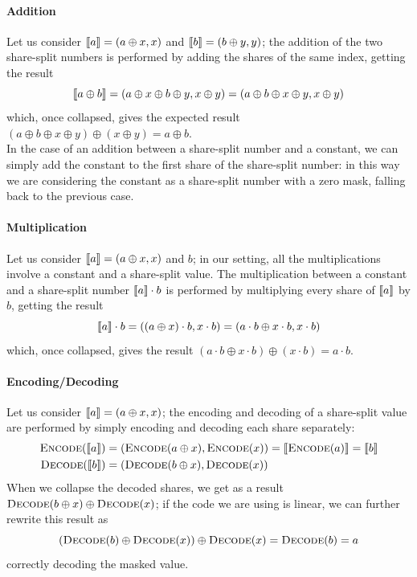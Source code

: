     \paragraph{Addition} Let us consider $ \llbracket a \rrbracket  = (a\oplus x, x)$ and $ \llbracket b \rrbracket  = (b\oplus y, y)$;
    the addition of the two share-split numbers is performed by adding the shares of the same index, getting the result
    \begin{equation*}
         \llbracket a\oplus b \rrbracket  = (a\oplus x \oplus b\oplus y, x \oplus y) = (a\oplus b\oplus x\oplus y, x \oplus y)
    \end{equation*}
    which, once collapsed, gives the expected result $(a \oplus b \oplus x \oplus y) \oplus (x \oplus y) = a \oplus b$.\\
    In the case of an addition between a share-split number and a constant, we can simply add the constant to the first share of the
    share-split number: in this way we are considering the constant as a share-split number with a zero mask, falling back to the previous case.

    \paragraph*{Multiplication} Let us consider $ \llbracket a \rrbracket  = (a\oplus x, x)$ and $b$; in our setting, all the multiplications
    involve a constant and a share-split value. The multiplication between a constant and a share-split number $ \llbracket a \rrbracket \cdot b$ is performed by multiplying
    every share of $ \llbracket a \rrbracket $ by $b$, getting the result 
    \begin{equation*}
         \llbracket a \rrbracket \cdot b = ((a\oplus x)\cdot b, x\cdot b) = (a\cdot b \oplus x\cdot b, x\cdot b)
    \end{equation*}
    which, once collapsed, gives the result $(a \cdot b \oplus x \cdot b) \oplus (x \cdot b) = a \cdot b$.

    \paragraph*{Encoding/Decoding} Let us consider $ \llbracket a \rrbracket  = (a\oplus x, x)$; the encoding and decoding of a share-split value
    are performed by simply encoding and decoding each share separately:
    \begin{equation*}
        \begin{aligned}
        \textsc{Encode}( \llbracket a \rrbracket ) &= (\textsc{Encode}(a\oplus x), \textsc{Encode}(x)) =  \llbracket \textsc{Encode}(a) \rrbracket  =  \llbracket b \rrbracket  \\
        \textsc{Decode}( \llbracket b \rrbracket ) &= (\textsc{Decode}(b\oplus x), \textsc{Decode}(x))
        \end{aligned}
    \end{equation*}
    When we collapse the decoded shares, we get as a result $\textsc{Decode}(b \oplus x) \oplus \textsc{Decode}(x)$; if the code we are using
    is linear, we can further rewrite this result as
    \begin{equation*}
        (\textsc{Decode}(b) \oplus \textsc{Decode}(x)) \oplus \textsc{Decode}(x) = \textsc{Decode}(b) = a
    \end{equation*}
    correctly decoding the masked value.


